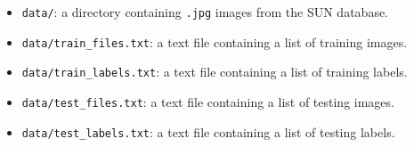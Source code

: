 \documentclass[10pt]{article}
\begin{document}
\begin{itemize}
\item {\tt data/}: a directory containing {\tt .jpg} images from the SUN database.
\item {\tt data/train\_files.txt}: a text file containing a list of training images.
\item {\tt data/train\_labels.txt}: a text file containing a list of training labels.
\item {\tt data/test\_files.txt}: a text file containing a list of testing images.
\item {\tt data/test\_labels.txt}: a text file containing a list of testing labels.


\end{itemize}
\end{document}
